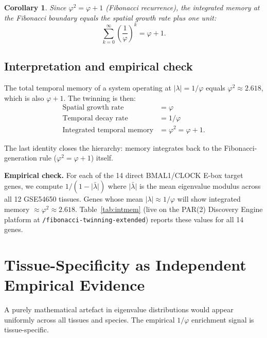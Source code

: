 \documentclass[11pt,letterpaper]{article}
\newtheorem{corollary}{Corollary}
\theoremstyle{definition}
\theoremstyle{remark}
\begin{document}
\begin{corollary}
Since $\varphi^2 = \varphi + 1$ (Fibonacci recurrence), the integrated memory at the Fibonacci
boundary equals the spatial growth rate plus one unit:
\[
\sum_{k=0}^{\infty}\left(\frac{1}{\varphi}\right)^k = \varphi + 1.
\]
\end{corollary}

\subsection*{Interpretation and empirical check}

The total temporal memory of a system operating at $|{\lambda}| = 1/\varphi$ equals $\varphi^2 \approx 2.618$,
which is also $\varphi + 1$. The twinning is then:
\begin{align*}
\text{Spatial growth rate} &= \varphi \\
\text{Temporal decay rate} &= 1/\varphi \\
\text{Integrated temporal memory} &= \varphi^2 = \varphi + 1.
\end{align*}

The last identity closes the hierarchy: memory integrates back to the Fibonacci-generation
rule ($\varphi^2 = \varphi + 1$) itself.

\noindent\textbf{Empirical check.}
For each of the 14 direct BMAL1/CLOCK E-box target genes, we compute
$1/(1 - \bar{|\lambda|})$ where $\bar{|\lambda|}$ is the mean eigenvalue modulus across all 12
GSE54650 tissues. Genes whose mean $|\lambda| \approx 1/\varphi$ will show integrated memory
$\approx \varphi^2 \approx 2.618$. Table~\ref{tab:intmem} (live on the PAR(2) Discovery Engine
platform at \texttt{/fibonacci-twinning-extended}) reports these values for all 14 genes.

\section{Tissue-Specificity as Independent Empirical Evidence}
\label{sec:tissue}

A purely mathematical artefact in eigenvalue distributions would appear uniformly across all
tissues and species. The empirical $1/\varphi$ enrichment signal is tissue-specific.
\end{document}
